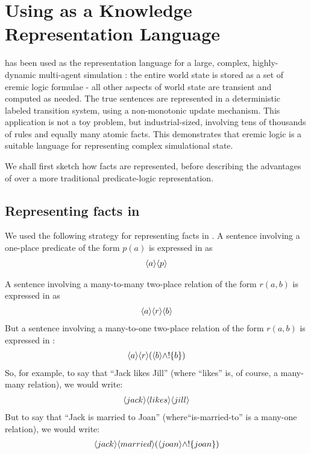 \section{Using \ELFULL{} as a Knowledge Representation Language}\label{kr}


\ELFULL{} has been used as the representation language for a large,
complex, highly-dynamic multi-agent simulation \cite{evans-and-short}:
the entire world state is stored as a set of eremic logic formulae -
all other aspects of world state are transient and computed as needed.
The true sentences are represented in a deterministic labeled
transition system, using a non-monotonic update mechanism.  This
application is not a toy problem, but industrial-sized, involving tens
of thousands of rules and equally many atomic facts.  This
demonstrates that eremic logic is a suitable language for representing
complex simulational state.

We shall first sketch how facts are represented, before describing the
advantages of \ELABR{} over a more traditional predicate-logic
representation.

\subsection{Representing facts  in \ELABR{}}

We used the following strategy for representing facts in \ELABR{}.  A
sentence involving a one-place predicate of the form $p(a)$ is
expressed in \ELABR{} as
\begin{eqnarray*}
   \langle a \rangle \langle p \rangle \end{eqnarray*}

\NI A sentence involving a many-to-many two-place relation of the form
$r(a,b)$ is expressed in \ELABR{} as
\begin{eqnarray*}
\langle a \rangle \langle r \rangle \langle b \rangle \end{eqnarray*}
But a sentence involving a many-to-one two-place relation of the form $r(a,b)$ is expressed in \ELABR{}:
\begin{eqnarray*}
\langle a \rangle \langle r \rangle (\langle b \rangle \land ! \{b\})
\end{eqnarray*}
So, for example, to say that ``Jack likes Jill'' (where ``likes'' is, of course, a many-many relation), we would write:
\begin{eqnarray*}
\langle jack \rangle \langle likes \rangle \langle jill \rangle \end{eqnarray*}
But to say that ``Jack is married to Joan'' (where``is-married-to'' is a many-one relation), we would write:
\begin{eqnarray*}
\langle jack \rangle \langle married \rangle (\langle joan \rangle \land ! \{joan\})
\end{eqnarray*}


